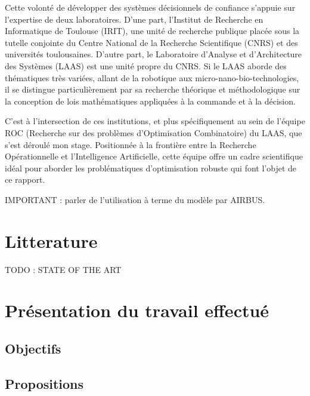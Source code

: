 \documentclass[12pt, a4paper, twoside]{report}
\begin{document}
Cette volonté de développer des systèmes décisionnels de confiance s'appuie sur l'expertise de deux laboratoires. D'une part, l'Institut de Recherche en Informatique de Toulouse (IRIT), une unité de recherche publique placée sous la tutelle conjointe du Centre National de la Recherche Scientifique (CNRS) et des universités toulousaines. D'autre part, le Laboratoire d'Analyse et d'Architecture des Systèmes (LAAS) est une unité propre du CNRS. Si le LAAS aborde des thématiques très variées, allant de la robotique aux micro-nano-bio-technologies, il se distingue particulièrement par sa recherche théorique et méthodologique sur la conception de lois mathématiques appliquées à la commande et à la décision.

C'est à l'intersection de ces institutions, et plus spécifiquement au sein de l'équipe ROC (Recherche sur des problèmes d'Optimisation Combinatoire) du LAAS, que s'est déroulé mon stage. Positionnée à la frontière entre la Recherche Opérationnelle et l'Intelligence Artificielle, cette équipe offre un cadre scientifique idéal pour aborder les problématiques d'optimisation robuste qui font l'objet de ce rapport.



IMPORTANT : parler de l'utilisation à terme du modèle par AIRBUS.


\clearpage
\section{Litterature}

TODO : STATE OF THE ART


\clearpage
\section{Présentation du travail effectué}


\subsection{Objectifs}


\subsection{Propositions}
\end{document}
